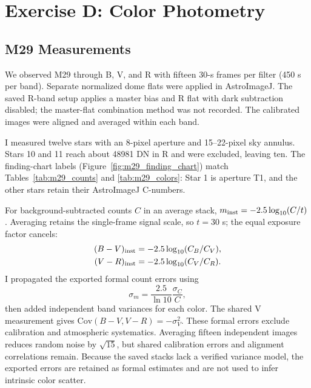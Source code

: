 \documentclass[12pt,letterpaper,twocolumn]{article}
\begin{document}
\section{Exercise D: Color Photometry}
\subsection{M29 Measurements}
We observed M29 through B, V, and R with fifteen 30-s frames per
filter (450 s per band). Separate normalized dome flats were applied
in AstroImageJ. The saved R-band setup applies a master bias and
R flat with dark subtraction disabled; the master-flat combination
method was not recorded. The calibrated images were aligned and
averaged within each band.

I measured twelve stars with an 8-pixel aperture and 15--22-pixel
sky annulus. Stars 10 and 11 reach about 48981 DN in R and were
excluded, leaving ten. The finding-chart labels (Figure~\ref{fig:m29_finding_chart}) match Tables~\ref{tab:m29_counts} and \ref{tab:m29_colors}: Star 1 is aperture T1, and the other stars retain their AstroImageJ C-numbers.

For background-subtracted counts $C$ in an average stack,
$m_{\rm inst}=-2.5\log_{10}(C/t)$. Averaging retains the single-frame
signal scale, so $t=30$ s; the equal exposure factor cancels:
\begin{align}
(B-V)_{\rm inst}&=-2.5\log_{10}(C_B/C_V),\\
(V-R)_{\rm inst}&=-2.5\log_{10}(C_V/C_R).
\end{align}
I propagated the exported formal count errors using
\begin{equation}
\sigma_m=\frac{2.5}{\ln10}\frac{\sigma_C}{C},
\end{equation}
then added independent band variances for each color. The shared V
measurement gives $\mathrm{Cov}(B-V,V-R)=-\sigma_V^2$.
These formal errors exclude calibration and atmospheric systematics. Averaging fifteen independent images reduces random noise by $\sqrt{15}$, but shared calibration errors and alignment correlations remain. Because the saved stacks lack a verified variance model, the exported errors are retained as formal estimates and are not used to infer intrinsic color scatter.
\end{document}
